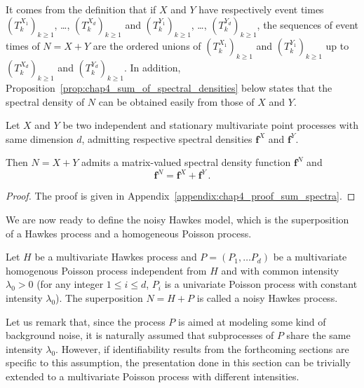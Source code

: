         It comes from the definition that if $X$ and $Y$ have respectively event times $(T_k^{X_1})_{k\ge1}$, \dots, $(T_k^{X_d})_{k\ge1}$ and $(T_k^{Y_1})_{k\ge1}$, \dots, $(T_k^{Y_d})_{k\ge1}$, the sequences of event times of $N = X + Y$ are the ordered unions of $(T_k^{X_1})_{k\geq1}$ and $(T_k^{Y_1})_{k\geq1}$ up to $(T_k^{X_d})_{k\geq1}$ and $(T_k^{Y_d})_{k\geq1}$.
        In addition, Proposition~\ref{prop:chap4_sum_of_spectral_densities} below states that the spectral density of $N$ can be obtained easily from those of $X$ and $Y$.

        \begin{proposition}\label{prop:chap4_sum_of_spectral_densities}
	        Let $X$ and $Y$ be two independent and stationary multivariate point processes with same dimension $d$, admitting respective spectral densities $\mathbf{f}^X$ and $\mathbf{f}^Y$.
	        
	        Then $N = X + Y$ admits a matrix-valued spectral density function $\mathbf f^N$ and
	        \begin{equation} \label{eq:chap4_sum_spectral_densities}
		        \mathbf{f}^N = \mathbf{f}^X + \mathbf{f}^Y\,.
	        \end{equation}
        \end{proposition}

        \begin{proof}
          The proof is given in Appendix~\ref{appendix:chap4_proof_sum_spectra}.
        \end{proof}

	      We are now ready to define the noisy Hawkes model, which is the superposition of a Hawkes process and a homogeneous Poisson process.
	      
	      \begin{definition}
		      Let $H$ be a multivariate Hawkes process
		      and $P=(P_1, \ldots P_d)$ be a multivariate homogenous Poisson process
		      independent from $H$ and
		      with common intensity $\lambda_0 > 0$ (\ie for any integer $1 \le i \le d$, $P_i$ is a univariate Poisson process with constant intensity $\lambda_0$).
		      The superposition $N = H + P$ is called a noisy Hawkes process.
	      \end{definition}
	      
	      Let us remark that, since the process $P$ is aimed at modeling
        some kind of background noise,
        it is naturally assumed that subprocesses of $P$ share the same intensity $\lambda_0$.
        However, if identifiability results from the forthcoming sections are specific to this assumption,
        the presentation done in this section can be trivially extended to a multivariate Poisson process with different intensities.
	      
